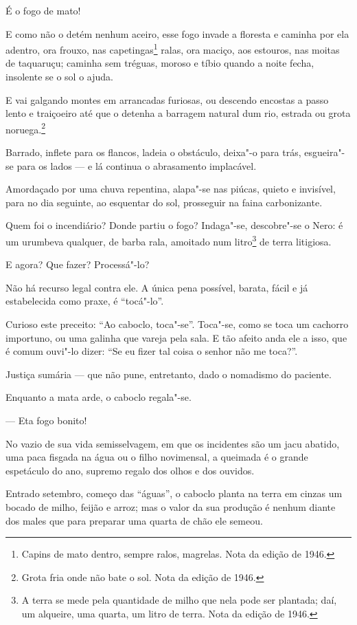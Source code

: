 É o fogo de mato!

E como não o detém nenhum aceiro, esse fogo invade a floresta e caminha
por ela adentro, ora frouxo, nas capetingas\footnote{Capins de mato
  dentro, sempre ralos, magrelas. Nota da edição de 1946.} ralas, ora
maciço, aos estouros, nas moitas de taquaruçu; caminha sem tréguas,
moroso e tíbio quando a noite fecha, insolente se o sol o ajuda.

E vai galgando montes em arrancadas furiosas, ou descendo encostas a
passo lento e traiçoeiro até que o detenha a barragem natural dum rio,
estrada ou grota noruega.\footnote{Grota fria onde não bate o sol. Nota
  da edição de 1946.}

Barrado, inflete para os flancos, ladeia o obstáculo, deixa"-o para trás,
esgueira"-se para os lados --- e lá continua o abrasamento implacável.

Amordaçado por uma chuva repentina, alapa"-se nas piúcas, quieto e
invisível, para no dia seguinte, ao esquentar do sol, prosseguir na
faina carbonizante.

Quem foi o incendiário? Donde partiu o fogo? Indaga"-se, descobre"-se o
Nero: é um urumbeva qualquer, de barba rala, amoitado num
litro\footnote{A terra se mede pela quantidade de milho que nela pode
  ser plantada; daí, um alqueire, uma quarta, um litro de terra. Nota da
  edição de 1946.} de terra litigiosa.

E agora? Que fazer? Processá"-lo?

Não há recurso legal contra ele. A única pena possível, barata, fácil e
já estabelecida como praxe, é ``tocá"-lo''.

Curioso este preceito: ``Ao caboclo, toca"-se''. Toca"-se, como se toca um
cachorro importuno, ou uma galinha que vareja pela sala. E tão afeito
anda ele a isso, que é comum ouvi"-lo dizer: ``Se eu fizer tal coisa o
senhor não me toca?''.

Justiça sumária --- que não pune, entretanto, dado o nomadismo do
paciente.

Enquanto a mata arde, o caboclo regala"-se.

--- Eta fogo bonito!

No vazio de sua vida semisselvagem, em que os incidentes são um jacu
abatido, uma paca fisgada na água ou o filho novimensal, a queimada é o
grande espetáculo do ano, supremo regalo dos olhos e dos ouvidos.

Entrado setembro, começo das ``águas'', o caboclo planta na terra em
cinzas um bocado de milho, feijão e arroz; mas o valor da sua produção é
nenhum diante dos males que para preparar uma quarta de chão ele semeou.

